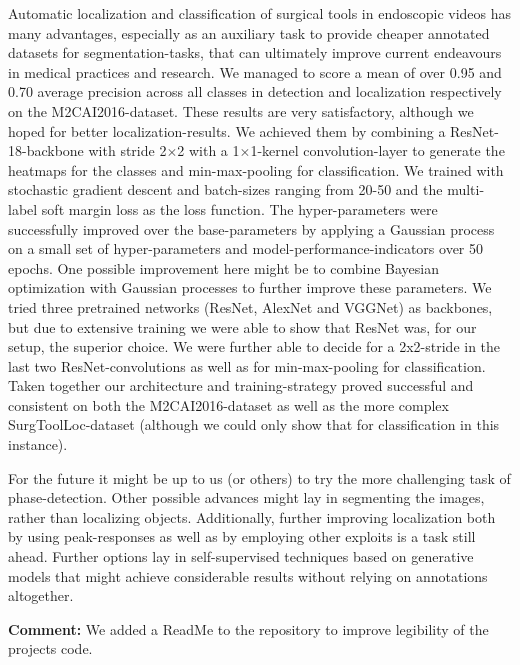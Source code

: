 Automatic localization and classification of surgical tools in endoscopic videos has many advantages, especially as an auxiliary task to provide cheaper annotated datasets for segmentation-tasks, that can ultimately improve current endeavours in medical practices and research. We managed to score a mean of over 0.95 and 0.70 average precision across all classes in detection and localization respectively on the M2CAI2016-dataset. 
These results are very satisfactory, although we hoped for better localization-results. We achieved them by combining a ResNet-18-backbone with stride 2$\times$2 with a 1$\times$1-kernel convolution-layer to generate the heatmaps for the classes and min-max-pooling for classification. 
We trained with stochastic gradient descent and batch-sizes ranging from 20-50 and the multi-label soft margin loss as the loss function.
The hyper-parameters were successfully improved over the base-parameters by applying a Gaussian process on a small set of hyper-parameters and model-performance-indicators over 50 epochs. One possible improvement here might be to combine Bayesian optimization with Gaussian processes to further improve these parameters.
We tried three pretrained networks (ResNet, AlexNet and VGGNet) as backbones, but due to extensive training we were able to show that ResNet was, for our setup, the superior choice. We were further able to decide for a 2x2-stride in the last two ResNet-convolutions as well as for min-max-pooling for classification. Taken together our architecture and training-strategy proved successful and consistent on both the M2CAI2016-dataset as well as the more complex SurgToolLoc-dataset (although we could only show that for classification in this instance).

For the future it might be up to us (or others) to try the more challenging task of phase-detection. Other possible advances might lay in segmenting the images, rather than localizing objects. Additionally, further improving localization both by using peak-responses as well as by employing other exploits is a task still ahead. Further options lay in self-supervised techniques based on generative models that might achieve considerable results without relying on annotations altogether.

\textbf{Comment:} We added a ReadMe to the repository to improve legibility of the projects code.